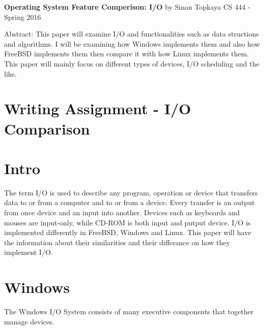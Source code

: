 \documentclass[letterpaper,10pt,draftclsnofoot,onecolumn]{IEEEtran}
\begin{document}
	\begin{titlepage}
		
		\begin{center}
		\bigbreak	
		\textbf{Operating System Feature Comperison: I/O}
		\bigbreak
		by Sinan Topkaya
		\smallbreak
		CS 444 - Spring 2016
		\end{center}
		\vfill
		
		Abstract: This paper will examine I/O and functionalities such as data structions and algorithms. I will be examining how Windows implements them and also how FreeBSD implements them then compare it with how Linux implements them. This paper will mainly focus on different types of devices, I/O scheduling and the like.
		
	\end{titlepage}

\section*{Writing Assignment - I/O Comparison}
\section*{Intro}

The term I/O is used to describe any program, operation or device that transfers data to or from a computer and to or from a device. Every transfer is an output from once device and an input into another. Devices such as keyboards and mouses are input-only, while CD-ROM is both input and putput device. I/O is implemented differently in FreeBSD, Windows and Linux. This paper will have the information about their similarities and their differance on how they implement I/O.

\section*{Windows}

The Windows I/O System consists of many executive components that together manage devices. 
\end{document}
